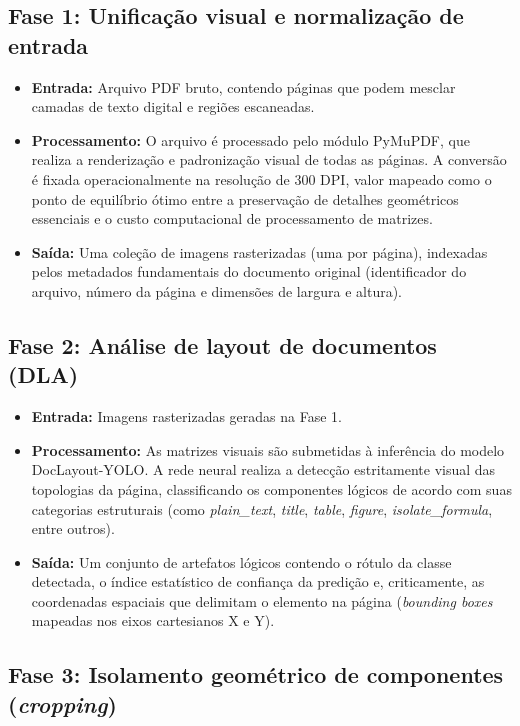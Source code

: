 \subsection{Fase 1: Unificação visual e normalização de entrada}
\label{subsec:fase1_unificacao_visual}

\begin{itemize}
    \item \textbf{Entrada:} Arquivo PDF bruto, contendo páginas que podem mesclar camadas de texto digital e regiões escaneadas.
    \item \textbf{Processamento:} O arquivo é processado pelo módulo PyMuPDF, que realiza a renderização e padronização visual de todas as páginas. A conversão é fixada operacionalmente na resolução de 300 DPI, valor mapeado como o ponto de equilíbrio ótimo entre a preservação de detalhes geométricos essenciais e o custo computacional de processamento de matrizes.
    \item \textbf{Saída:} Uma coleção de imagens rasterizadas (uma por página), indexadas pelos metadados fundamentais do documento original (identificador do arquivo, número da página e dimensões de largura e altura).
\end{itemize}

\subsection{Fase 2: Análise de layout de documentos (DLA)}
\label{subsec:fase2_analise_layout}

\begin{itemize}
    \item \textbf{Entrada:} Imagens rasterizadas geradas na Fase 1.
    \item \textbf{Processamento:} As matrizes visuais são submetidas à inferência do modelo DocLayout-YOLO. A rede neural realiza a detecção estritamente visual das topologias da página, classificando os componentes lógicos de acordo com suas categorias estruturais (como \textit{plain\_text}, \textit{title}, \textit{table}, \textit{figure}, \textit{isolate\_formula}, entre outros).
    \item \textbf{Saída:} Um conjunto de artefatos lógicos contendo o rótulo da classe detectada, o índice estatístico de confiança da predição e, criticamente, as coordenadas espaciais que delimitam o elemento na página (\textit{bounding boxes} mapeadas nos eixos cartesianos X e Y).
\end{itemize}

\subsection{Fase 3: Isolamento geométrico de componentes (\textit{cropping})}
\label{subsec:fase3_isolamento_geometrico}


